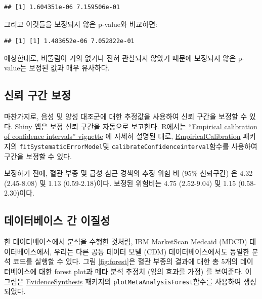 \documentclass[10.5pt]{book}
\newenvironment{Shaded}{\begin{snugshade}}{\end{snugshade}}
\newcommand{\OperatorTok}[1]{\textcolor[rgb]{0.81,0.36,0.00}{\textbf{#1}}}
\newcommand{\NormalTok}[1]{#1}
\theoremstyle{definition}
\theoremstyle{definition}
\theoremstyle{definition}
\theoremstyle{remark}
\begin{document}
\begin{verbatim}
## [1] 1.604351e-06 7.159506e-01
\end{verbatim}

그리고 이것들을 보정되지 않은 p-value와 비교하면:

\begin{Shaded}
\end{Shaded}

\begin{verbatim}
## [1] [1] 1.483652e-06 7.052822e-01
\end{verbatim}

예상한대로, 비뚤림이 거의 없거나 전혀 관찰되지 않았기 때문에 보정되지
않은 p-value는 보정된 값과 매우 유사하다.

\subsection{신뢰 구간 보정}\label{---1}

마찬가지로, 음성 및 양성 대조군에 대한 추정값을 사용하여 신뢰 구간을
보정할 수 있다. Shiny 앱은 보정 신뢰 구간을 자동으로 보고한다. R에서는
\href{https://ohdsi.github.io/EmpiricalCalibration/articles/EmpiricalCiCalibrationVignette.html}{``Empirical
calibration of confidence intervals'' vignette} 에 자세히 설명된 대로,
\href{https://ohdsi.github.io/EmpiricalCalibration/}{EmpiricalCalibration}
패키지의 \texttt{fitSystematicErrorModel}및
\texttt{calibrateConfidenceinterval}함수를 사용하여 구간을 보정할 수
있다.

보정하기 전에, 혈관 부종 및 급성 심근 경색의 추정 위험 비 (95\%
신뢰구간) 은 4.32 (2.45-8.08) 및 1.13 (0.59-2.18)이다. 보정된 위험비는
4.75 (2.52-9.04) 및 1.15 (0.58-2.30)이다.

\subsection{데이터베이스 간 이질성}\label{--}

한 데이터베이스에서 분석을 수행한 것처럼, IBM MarketScan Medcaid (MDCD)
데이터베이스에서, 우리는 다른 공통 데이터 모델 (CDM) 데이터베이스에서도
동일한 분석 코드를 실행할 수 있다. 그림 \ref{fig:forest}은 혈관 부종의
결과에 대한 총 5개의 데이터베이스에 대한 forest plot과 메타 분석 추정치
(임의 효과를 가정) \citep{dersimonian_1986} 를 보여준다. 이 그림은
\href{https://ohdsi.github.io/EvidenceSynthesis/}{EvidenceSynthesis}
패키지의 \texttt{plotMetaAnalysisForest}함수를 사용하여 생성되었다.
\end{document}
